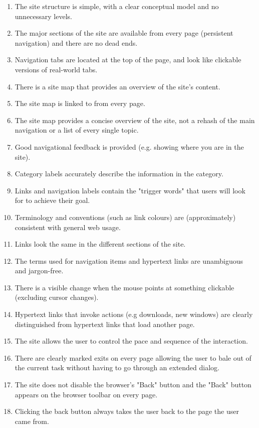 \begin{itemize}
\begin{enumerate}
        \item The site structure is simple, with a clear conceptual model and no unnecessary levels.
        \item The major sections of the site are available from every page (persistent navigation) and there are no dead ends.
        \item Navigation tabs are located at the top of the page, and look like clickable versions of real-world tabs.
        \item There is a site map that provides an overview of the site's content.
        \item The site map is linked to from every page.
        \item The site map provides a concise overview of the site, not a rehash of the main navigation or a list of every single topic.
        \item Good navigational feedback is provided (e.g. showing where you are in the site).
        \item Category labels accurately describe the information in the category.
        \item Links and navigation labels contain the "trigger words" that users will look for to achieve their goal.
        \item Terminology and conventions (such as link colours) are (approximately) consistent with general web usage.
        \item Links look the same in the different sections of the site.
        \item The terms used for navigation items and hypertext links are unambiguous and jargon-free.
        \item There is a visible change when the mouse points at something clickable (excluding cursor changes).
        \item Hypertext links that invoke actions (e.g downloads, new windows) are clearly distinguished from hypertext links that load another page.
        \item The site allows the user to control the pace and sequence of the interaction.
        \item There are clearly marked exits on every page allowing the user to bale out of the current task without having to go through an extended dialog.
        \item The site does not disable the browser's "Back" button and the "Back" button appears on the browser toolbar on every page.
        \item Clicking the back button always takes the user back to the page the user came from.

\end{enumerate}
\end{itemize}
